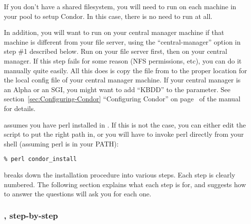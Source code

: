 If you don't have a shared filesystem, you will need to run
 on each machine in your pool to setup Condor.  In
this case, there is no need to run  at all.

In addition, you will want to run  on your central
manager machine if that machine is different from your file server,
using the ``central-manager'' option in step \#1 described below.  Run
 on your file server first, then on your central
manager.  If this step fails for some reason (NFS permissions, etc),
you can do it manually quite easily.  All this does is copy the
 file from
 to the proper location for the local config
file of your central manager machine.  If your central manager is an
Alpha or an SGI, you might want to add ``KBDD'' to the
 parameter.  See
section~\ref{sec:Configuring-Condor} ``Configuring Condor'' on
page~\pageref{sec:Configuring-Condor} of the manual for details.

 assumes you have perl installed in .  If
this is not the case, you can either edit the script to put the right
path in, or you will have to invoke perl directly from your shell
(assuming perl is in your PATH):
\begin{verbatim}
% perl condor_install
\end{verbatim}

 breaks down the installation procedure into various
steps.  Each step is clearly numbered.  The following section explains
what each step is for, and suggests how to answer the questions
 will ask you for each one.

\subsubsection{, step-by-step}

